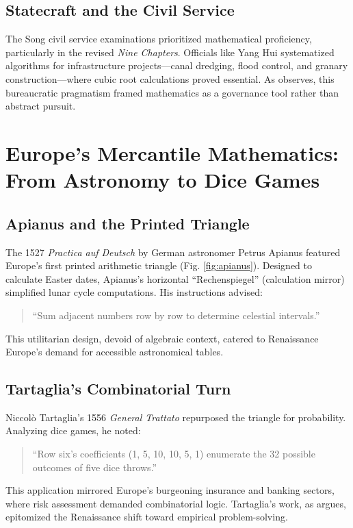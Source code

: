 \documentclass{article}
\begin{document}
\subsection{Statecraft and the Civil Service}
The Song civil service examinations prioritized mathematical proficiency, particularly in the revised \textit{Nine Chapters}. Officials like Yang Hui systematized algorithms for infrastructure projects—canal dredging, flood control, and granary construction—where cubic root calculations proved essential. As \cite{martzloff1997} observes, this bureaucratic pragmatism framed mathematics as a governance tool rather than abstract pursuit.

\section{Europe’s Mercantile Mathematics: From Astronomy to Dice Games}

\subsection{Apianus and the Printed Triangle}
The 1527 \textit{Practica auf Deutsch} by German astronomer Petrus Apianus featured Europe’s first printed arithmetic triangle (Fig. \ref{fig:apianus}). Designed to calculate Easter dates, Apianus’s horizontal “Rechenspiegel” (calculation mirror) simplified lunar cycle computations. His instructions advised: 
\begin{quote}
    “Sum adjacent numbers row by row to determine celestial intervals.”  
\end{quote}
This utilitarian design, devoid of algebraic context, catered to Renaissance Europe’s demand for accessible astronomical tables.

\subsection{Tartaglia’s Combinatorial Turn}
Niccolò Tartaglia’s 1556 \textit{General Trattato} repurposed the triangle for probability. Analyzing dice games, he noted: 
\begin{quote}
    “Row six’s coefficients (1, 5, 10, 10, 5, 1) enumerate the 32 possible outcomes of five dice throws.”  
\end{quote}
This application mirrored Europe’s burgeoning insurance and banking sectors, where risk assessment demanded combinatorial logic. Tartaglia’s work, as \cite{stedall2012} argues, epitomized the Renaissance shift toward empirical problem-solving.
\end{document}
